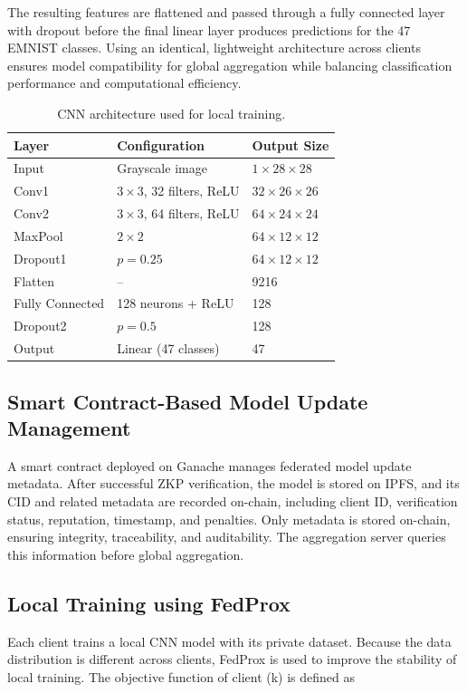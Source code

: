 \documentclass[conference, a4paper]{IEEEtran}
\begin{document}
The resulting features are flattened and passed through a fully connected layer with dropout before the final linear layer produces predictions for the 47 EMNIST classes. Using an identical, lightweight architecture across clients ensures model compatibility for global aggregation while balancing classification performance and computational efficiency.


\begin{table}[H]
\caption{CNN architecture used for local training.}
\label{tab:cnn}
\centering
\begin{tabular}{|l|l|l|}
\hline
\textbf{Layer} & \textbf{Configuration} & \textbf{Output Size} \\
\hline
Input & Grayscale image & $1\times28\times28$ \\
\hline
Conv1 & $3\times3$, 32 filters, ReLU & $32\times26\times26$ \\
\hline
Conv2 & $3\times3$, 64 filters, ReLU & $64\times24\times24$ \\
\hline
MaxPool & $2\times2$ & $64\times12\times12$ \\
\hline
Dropout1 & $p=0.25$ & $64\times12\times12$ \\
\hline
Flatten & -- & 9216 \\
\hline
Fully Connected & 128 neurons + ReLU & 128 \\
\hline
Dropout2 & $p=0.5$ & 128 \\
\hline
Output & Linear (47 classes) & 47 \\
\hline
\end{tabular}
\end{table}

\subsection{Smart Contract-Based Model Update Management}

A smart contract deployed on Ganache manages federated model
update metadata. After successful ZKP verification, the model
is stored on IPFS, and its CID and related metadata are recorded
on-chain, including client ID, verification status, reputation,
timestamp, and penalties. Only metadata is stored on-chain,
ensuring integrity, traceability, and auditability. The aggregation
server queries this information before global aggregation.

\subsection{Local Training using FedProx}
Each client trains a local CNN model with its private dataset. Because the data distribution is different across clients, FedProx is used to improve the stability of local training. The objective function of client (k) is defined as
\end{document}
